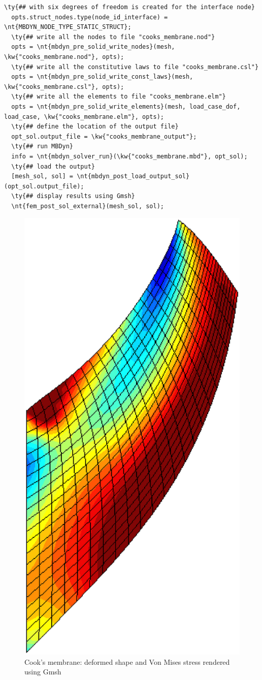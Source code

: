 \begin{Verbatim}[commandchars=\\\{\}]
  \ty{## with six degrees of freedom is created for the interface node}
  opts.struct_nodes.type(node_id_interface) = \nt{MBDYN_NODE_TYPE_STATIC_STRUCT};
  \ty{## write all the nodes to file "cooks_membrane.nod"}
  opts = \nt{mbdyn_pre_solid_write_nodes}(mesh, \kw{"cooks_membrane.nod"}, opts);
  \ty{## write all the constitutive laws to file "cooks_membrane.csl"}
  opts = \nt{mbdyn_pre_solid_write_const_laws}(mesh, \kw{"cooks_membrane.csl"}, opts);
  \ty{## write all the elements to file "cooks_membrane.elm"}
  opts = \nt{mbdyn_pre_solid_write_elements}(mesh, load_case_dof, load_case, \kw{"cooks_membrane.elm"}, opts);
  \ty{## define the location of the output file}
  opt_sol.output_file = \kw{"cooks_membrane_output"};
  \ty{## run MBDyn}
  info = \nt{mbdyn_solver_run}(\kw{"cooks_membrane.mbd"}, opt_sol);
  \ty{## load the output}
  [mesh_sol, sol] = \nt{mbdyn_post_load_output_sol}(opt_sol.output_file);
  \ty{## display results using Gmsh}
  \nt{fem_post_sol_external}(mesh_sol, sol);
\end{Verbatim}

\begin{figure}[htb]
\centering
\includegraphics[width=.25\textwidth]{elemsolid}
\caption{Cook's membrane: deformed shape and Von Mises stress rendered using Gmsh}
\label{fig:EL:SOLID:COOKS-MEMBRANE}
\end{figure}
\clearpage
